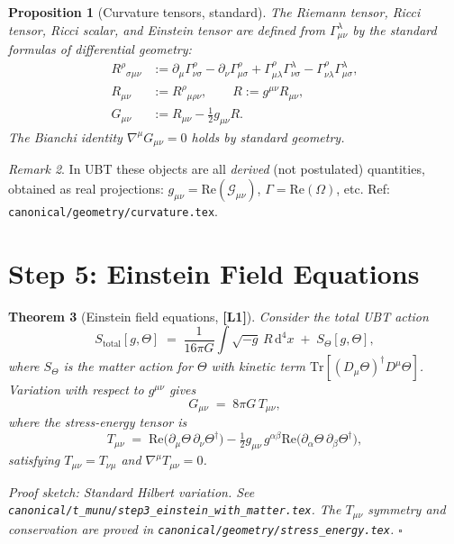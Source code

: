 \documentclass[12pt,a4paper]{article}
\newtheorem{theorem}{Theorem}[section]
\newtheorem{proposition}[theorem]{Proposition}
\theoremstyle{definition}
\theoremstyle{remark}
\newtheorem{remark}[theorem]{Remark}
\newcommand{\Lone}{\textbf{[L1]}}
\begin{document}
\begin{proposition}[Curvature tensors, standard]
\label{prop:curvature}
The Riemann tensor, Ricci tensor, Ricci scalar, and Einstein tensor are defined from
$\Gamma^\lambda_{\mu\nu}$ by the standard formulas of differential geometry:
\begin{align}
  R^\rho{}_{\sigma\mu\nu} &:= \partial_\mu\Gamma^\rho_{\nu\sigma}
    - \partial_\nu\Gamma^\rho_{\mu\sigma}
    + \Gamma^\rho_{\mu\lambda}\Gamma^\lambda_{\nu\sigma}
    - \Gamma^\rho_{\nu\lambda}\Gamma^\lambda_{\mu\sigma}, \\
  R_{\mu\nu} &:= R^\rho{}_{\mu\rho\nu}, \qquad R := g^{\mu\nu}R_{\mu\nu}, \\
  G_{\mu\nu} &:= R_{\mu\nu} - \tfrac{1}{2}g_{\mu\nu}R.
\end{align}
The Bianchi identity $\nabla^\mu G_{\mu\nu} = 0$ holds by standard geometry.
\end{proposition}

\begin{remark}
In UBT these objects are all \emph{derived} (not postulated) quantities,
obtained as real projections:
$g_{\mu\nu} = \mathrm{Re}(\mathcal{G}_{\mu\nu})$,
$\Gamma = \mathrm{Re}(\Omega)$, etc.
Ref: \texttt{canonical/geometry/curvature.tex}.
\end{remark}

\section{Step 5: Einstein Field Equations}
\label{sec:step5}

\begin{theorem}[Einstein field equations, \Lone]
\label{thm:einstein}
Consider the total UBT action
\[
  S_{\mathrm{total}}[g,\Theta]
  \;=\; \frac{1}{16\pi G}\int \sqrt{-g}\,R\,\mathrm{d}^4x
  \;+\; S_\Theta[g,\Theta],
\]
where $S_\Theta$ is the matter action for $\Theta$ with kinetic term
$\mathrm{Tr}[(D_\mu\Theta)^\dagger D^\mu\Theta]$.
Variation with respect to $g^{\mu\nu}$ gives
\[
  G_{\mu\nu} \;=\; 8\pi G\,T_{\mu\nu},
\]
where the stress-energy tensor is
\[
  T_{\mu\nu} \;=\; \mathrm{Re}\bigl(\partial_\mu\Theta\,\partial_\nu\Theta^\dagger\bigr)
  - \tfrac{1}{2}g_{\mu\nu}\,g^{\alpha\beta}
    \mathrm{Re}\bigl(\partial_\alpha\Theta\,\partial_\beta\Theta^\dagger\bigr),
\]
satisfying $T_{\mu\nu} = T_{\nu\mu}$ and $\nabla^\mu T_{\mu\nu} = 0$.

\medskip
\emph{Proof sketch}: Standard Hilbert variation.  See
\texttt{canonical/t\_munu/step3\_einstein\_with\_matter.tex}.
The $T_{\mu\nu}$ symmetry and conservation are proved in
\texttt{canonical/geometry/stress\_energy.tex}.
\hfill$\square$
\end{theorem}
\end{document}
